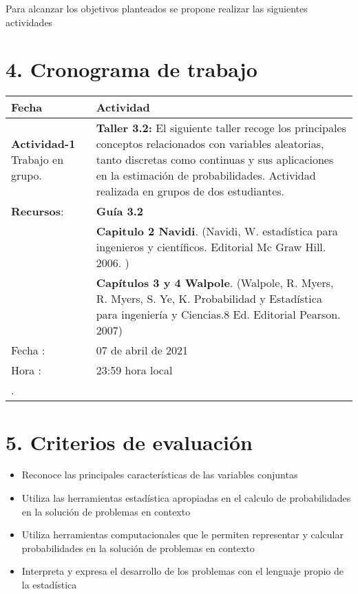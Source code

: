 \documentclass[base=hide,11pt]{elegantbook}
\begin{document}
Para alcanzar los objetivos planteados se propone realizar las siguientes actividades
% 	
\section*{4. Cronograma de trabajo}


\begin{tabular}{p{4cm}p{10cm}}
\hline	
Fecha                   & {\bf Actividad}	\\
\hline 	
\textcolor{col4}{\bf Actividad-1} \hspace{2cm} Trabajo en grupo.  &
\textcolor{col4}{\bf Taller 3.2:} El siguiente taller recoge los principales conceptos relacionados con variables aleatorias, tanto discretas como continuas y sus aplicaciones en la estimación de probabilidades. Actividad realizada en grupos de dos estudiantes. \\
{\bf Recursos}: & {\bf Guía 3.2} \\
          & {\bf Capitulo  2 Navidi}.  (Navidi, W. estadística para ingenieros y científicos. Editorial Mc Graw Hill. 2006. )\\
          & {\bf Capítulos  3 y 4 Walpole}. (Walpole, R. Myers, R. Myers, S. Ye, K. Probabilidad y Estadística para ingeniería y Ciencias.8 Ed. Editorial Pearson. 2007)\\
Fecha  : & 07 de abril  de 2021\\
Hora   : & 23:59 hora local \\
\hline 


.


\end{tabular}
\section*{5. Criterios de evaluación}

\begin{itemize}
	\item Reconoce las principales características de las variables conjuntas 
	\item Utiliza las herramientas estadística apropiadas en el calculo de probabilidades en la solución de problemas en contexto
	\item Utiliza herramientas computacionales que le permiten representar y calcular probabilidades en la solución de problemas en contexto
	\item Interpreta y expresa el desarrollo de los problemas con el lenguaje propio de la estadística
\end{itemize}
\end{document}
